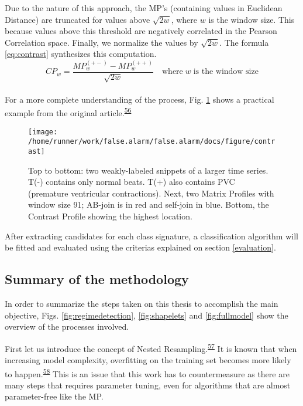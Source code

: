 \documentclass[12pt,twoside]{fmupthesis}
\begin{document}
Due to the nature of this approach, the MP's (containing values in Euclidean Distance) are truncated
for values above \(\sqrt{2w}\), where \(w\) is the window size. This because values above this threshold
are negatively correlated in the Pearson Correlation space. Finally, we normalize the values by
\(\sqrt{2w}\). The formula \eqref{eq:contrast} synthesizes this computation.
\begin{equation}
CP_w = \frac{MP_{w}^{(+-)} - MP_{w}^{(++)}}{\sqrt{2w}} \quad \text{where}\; w \; \text{is the window size} \label{eq:contrast}
\end{equation}\\
For a more complete understanding of the process, Fig. \ref{fig:contrast} shows a practical example
from the original article.\textsuperscript{\protect\hyperlink{ref-Mercer2021}{56}}
\begin{figure}

{\centering \texttt{[image: /home/runner/work/false.alarm/false.alarm/docs/figure/contrast]} 

}

\caption{Top to bottom: two weakly-labeled snippets of a larger time series. T(-) contains only normal beats. T(+) also contains PVC (premature ventricular contractions). Next, two Matrix Profiles with window size 91; AB-join is in red and self-join in blue. Bottom, the Contrast Profile showing the highest location.}\label{fig:contrast}
\end{figure}
After extracting candidates for each class signature, a classification algorithm will be fitted and
evaluated using the criterias explained on section \ref{evaluation}.

\hypertarget{summary-of-the-methodology}{%
\subsection{Summary of the methodology}\label{summary-of-the-methodology}}

In order to summarize the steps taken on this thesis to accomplish the main objective, Figs.
\ref{fig:regimedetection}, \ref{fig:shapelets} and \ref{fig:fullmodel} show the overview of the
processes involved.

First let us introduce the concept of Nested Resampling.\textsuperscript{\protect\hyperlink{ref-Bischl2012}{57}} It is known that when
increasing model complexity, overfitting on the training set becomes more likely to happen.\textsuperscript{\protect\hyperlink{ref-Hastie2009}{58}} This is an issue that this work has to countermeasure as there are many steps that
requires parameter tuning, even for algorithms that are almost parameter-free like the MP.
\end{document}
